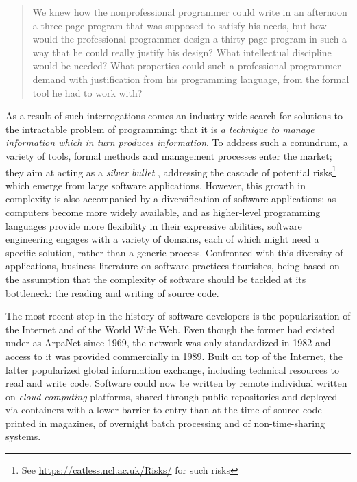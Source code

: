 \begin{quote}
  We knew how the nonprofessional programmer could write in an afternoon a three-page program that was supposed to satisfy his needs, but how would the professional programmer design a thirty-page program in such a way that he could really justify his design? What intellectual discipline would be needed? What properties could such a professional programmer demand with justification from his programming language, from the formal tool he had to work with?  \citep{dijkstra_chapter_1972}
\end{quote}

As a result of such interrogations comes an industry-wide search for solutions to the intractable problem of programming: that it is \emph{a technique to manage information which in turn produces information}. To address such a conundrum, a variety of tools, formal methods and management processes enter the market; they aim at acting as a \emph{silver bullet} \citep{brooks_mythical_1975}, addressing the cascade of potential risks\footnote{See \url{https://catless.ncl.ac.uk/Risks/} for such risks} which emerge from large software applications. However, this growth in complexity is also accompanied by a diversification of software applications: as computers become more widely available, and as higher-level programming languages provide more flexibility in their expressive abilities, software engineering engages with a variety of domains, each of which might need a specific solution, rather than a generic process. Confronted with this diversity of applications, business literature on software practices flourishes, being based on the assumption that the complexity of software should be tackled at its bottleneck: the reading and writing of source code.

The most recent step in the history of software developers is the popularization of the Internet and of the World Wide Web. Even though the former had existed under as ArpaNet since 1969, the network was only standardized in 1982 and access to it was provided commercially in 1989. Built on top of the Internet, the latter popularized global information exchange, including technical resources to read and write code. Software could now be written by remote individual written on \emph{cloud computing} platforms, shared through public repositories and deployed via containers with a lower barrier to entry than at the time of source code printed in magazines, of overnight batch processing and of non-time-sharing systems.

